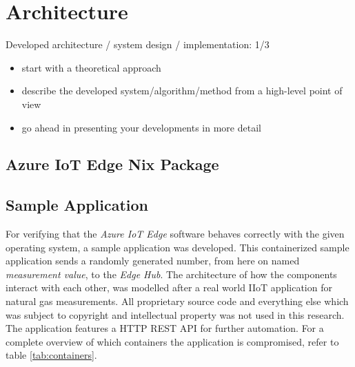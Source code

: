 \chapter{Architecture}

Developed architecture / system design / implementation: 1/3

\begin{itemize}
\item start with a theoretical approach
\item describe the developed system/algorithm/method from a high-level point of view
\item go ahead in presenting your developments in more detail
\end{itemize}


\section{Azure IoT Edge Nix Package}

\section{Sample Application}
For verifying that the \textit{Azure IoT Edge} software behaves correctly
with the given operating system, a sample application was developed. This
containerized sample application sends a randomly generated number, from here
on named \textit{measurement value}, to the \textit{Edge Hub}. The architecture
of how the components interact with each other, was modelled after a real
world \ac{IIoT} application for natural gas measurements. All proprietary
source code and everything else which was subject to copyright and intellectual
property was not used in this research. The application features a \ac{HTTP}
\ac{REST} \ac{API} for further automation. For a complete overview of which
containers the application is compromised, refer to table \ref{tab:containers}.


